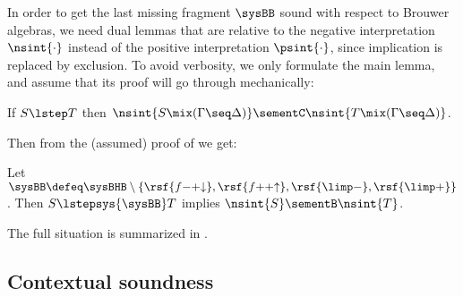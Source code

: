 In order to get the last missing fragment $\sysBB$ sound with respect to Brouwer
algebras, we need dual lemmas that are relative to the negative interpretation
$\nsint{\cdot}$ instead of the positive interpretation $\psint{\cdot}$, since
implication is replaced by exclusion. To avoid verbosity, we only formulate the
main lemma, and assume that its proof will go through mechanically:

\begin{lemma}
  If $S \lstep T$ then $\nsint{S \mix (\Gamma \seq \Delta)} \sementC \nsint{T
  \mix (\Gamma \seq \Delta)}$.
\end{lemma}

Then from the (assumed) proof of  we get:
\begin{corollary}\label{cor:lcosoundness}
  Let $\sysBB \defeq \sysBHB \setminus \{\rsf{f{-}{+}{\downarrow}},
  \rsf{f{+}{+}{\uparrow}}, \rsf{{\limp}{-}}, \rsf{{\limp}{+}}\}$. Then $S
  \lstepsys{\sysBB} T$ implies $\nsint{S} \sementB \nsint{T}$.
\end{corollary}

The full situation is summarized in .

\subsection{Contextual soundness}

